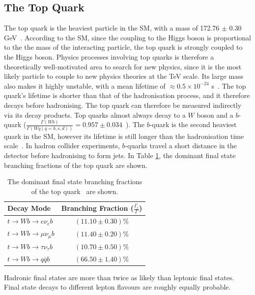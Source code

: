 \subsection{The Top Quark}
The top quark is the heaviest particle in the SM, with a mass of 172.76 $\pm$ 0.30 GeV~\cite{pdg}. According to the SM, since the coupling to the Higgs boson is proportional to the the mass of the interacting particle, the top quark is strongly coupled to the Higgs boson. Physics processes involving top quarks is therefore a theoretically well-motivated area to search for new physics, since it is the most likely particle to couple to new physics theories at the TeV scale. Its large mass also makes it highly unstable, with a mean lifetime of $\approx 0.5 \times 10^{-24}$ s~\cite{pdg}. The top quark's lifetime is shorter than that of the hadronisation process, and it therefore decays before hadronising. The top quark can therefore be measured indirectly via its decay products. Top quarks almost always decay to a $W$ boson and a $b$-quark ($\frac{\Gamma(Wb)}{\Gamma( Wq (q=b,s,d))} = 0.957\pm 0.034$~\cite{pdg}). The $b$-quark is the second heaviest quark in the SM, however its lifetime is still longer than the hadronisation time scale~\cite{pdg}. In hadron collider experiments, $b$-quarks travel a short distance in the detector before hadronising to form jets. In Table \ref{tab:top-decay-modes}, the dominant final state branching fractions of the top quark are shown.

\begin{table}[h!]
\def\arraystretch{1.5}%
\begin{tabular}{l|c}
\hline
Decay Mode & Branching Fraction ($\frac{\Gamma_{i}}{\Gamma}$)\\ \hline
$t \rightarrow Wb \rightarrow e\nu_{e} b$           &      $(11.10\pm 0.30)\%$     \\
$t \rightarrow Wb \rightarrow \mu \nu_{\mu} b$             &   $(11.40\pm 0.20)\%$        \\
       $t \rightarrow Wb \rightarrow \tau \nu_{\tau} b$      &  $(10.70\pm 0.50)\%$         \\
  $t \rightarrow Wb\rightarrow q\bar{q} b$           &      $(66.50\pm 1.40)\%$     \\ \hline
\end{tabular}
\centering
\caption{The dominant final state branching fractions of the top quark~\cite{pdg} are shown.}
\label{tab:top-decay-modes}
\end{table}

\noindent
Hadronic final states are more than twice as likely than leptonic final states. Final state decays to different lepton flavours are roughly equally probable.\\

